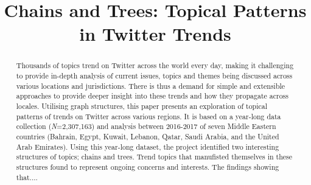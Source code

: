 \documentclass[conference]{IEEEtran}
\begin{document}
\title{Chains and Trees: Topical Patterns in Twitter Trends}

\author{
\and
{}
\and
{}
}

\maketitle

\begin{abstract}
Thousands of topics trend on Twitter across the world every day,
making it challenging to provide in-depth analysis of current issues,
topics and themes being discussed across various locations and
jurisdictions. There is thus a demand for simple and extensible
approaches to provide deeper insight into these trends and how they
propagate across locales. Utilising graph structures, this paper presents
an exploration of topical patterns of trends on Twitter across various regions. 
It is based on a year-long data collection ({\emph{N}}=2,307,163) and
analysis between 2016-2017 of seven Middle Eastern countries (Bahrain,
Egypt, Kuwait, Lebanon, Qatar, Saudi Arabia, and the United Arab
Emirates). Using this year-long dataset, the project identified two interesting 
structures of topics; chains and trees. Trend topics that manufisted themselves
in these structures found to represent ongoing concerns and interests. 
The findings showing that.... 
\end{abstract}
\end{document}
